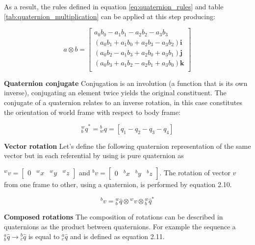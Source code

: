 As a result, the rules defined in equation \ref{eq:quaternion_rules} and table \ref{tab:quaternion_multiplication} can be applied at this step producing:

\begin{equation}
    a \otimes b =
    \begin{bmatrix}
        a_0 b_0 - a_1 b_1 - a_2 b_2 - a_3 b_3                 \\
        (a_0 b_1 + a_1 b_0 + a_2 b_3 - a_3 b_2)\boldsymbol{i} \\
        (a_0 b_2 - a_1 b_3 + a_2 b_0 + a_3 b_1)\boldsymbol{j} \\
        (a_0 b_3 + a_1 b_2 - a_2 b_1 + a_3 b_0)\boldsymbol{k} \\
    \end{bmatrix}
    \label{eq:quaternion_matrix}
\end{equation}

\item \textbf{Quaternion conjugate} Conjugation is an involution (a function that is its own inverse), conjugating an element twice yields the original constituent. The conjugate of a quaternion relates to an inverse rotation, in this case constitutes the orientation of world frame with respect to body frame:

\begin{equation}
    \textrm{$_{b}^{w}q$}^* =\textrm{$_{w}^{b}q$} = \left[q_1 - q_2 - q_3 - q_4\right]
\end{equation}

\item \textbf{Vector rotation} Let’s define the following quaternion representation of the same vector but in each referential by using is pure quaternion as

$ ^wv = \begin{bmatrix}
        0 & ^wx & ^wy & ^wz
    \end{bmatrix} $
and
$^bv = \begin{bmatrix}
        0 & ^bx & ^by & ^bz
    \end{bmatrix} $. The rotation of vector $v$ from one frame to other, using a quaternion, is performed by equation 2.10.

\begin{equation}
    \textrm{$^{b}v$} = \textrm{$_{b}^{w}\hat{q}$} \otimes \textrm{$^{w}v$} \otimes \textrm{$_{b}^{w}\hat{q}$}^*
\end{equation}

\item \textbf{Composed rotations} The composition of rotations can be described in quaternions as the product between quaternions. For example the sequence a $^a_b\hat{q} \rightarrow {^b_c\hat{q}}$ is equal to $^a_c{\hat{q}}$ and is defined as equation 2.11.


